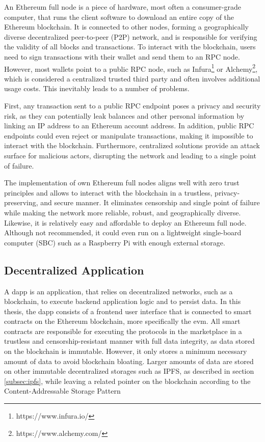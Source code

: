 An Ethereum full node is a piece of hardware, most often a consumer-grade computer, that runs the client software to download an entire copy of the Ethereum blockchain. It is connected to other nodes, forming a geographically diverse decentralized peer-to-peer (P2P) network, and is responsible for verifying the validity of all blocks and transactions. To interact with the blockchain, users need to sign transactions with their wallet and send them to an RPC node. However, most wallets point to a public RPC node, such as Infura\footnote{https://www.infura.io/} or Alchemy\footnote{https://www.alchemy.com/}, which is considered a centralized trusted third party and often involves additional usage costs. This inevitably leads to a number of problems.

First, any transaction sent to a public RPC endpoint poses a privacy and security risk, as they can potentially leak balances and other personal information by linking an IP address to an Ethereum account address. In addition, public RPC endpoints could even reject or manipulate transactions, making it impossible to interact with the blockchain. Furthermore, centralized solutions provide an attack surface for malicious actors, disrupting the network and leading to a single point of failure.

The implementation of own Ethereum full nodes aligns well with zero trust principles and allows to interact with the blockchain in a trustless, privacy-preserving, and secure manner. It eliminates censorship and single point of failure while making the network more reliable, robust, and geographically diverse. Likewise, it is relatively easy and affordable to deploy an Ethereum full node. Although not recommended, it could even run on a lightweight single-board computer (SBC) such as a Raspberry Pi with enough external storage.

\subsection{Decentralized Application}

A \acrfull{dapp} is an application, that relies on decentralized networks, such as a blockchain, to execute backend application logic and to persist data. In this thesis, the \acrshort{dapp} consists of a frontend user interface that is connected to smart contracts on the Ethereum blockchain, more specifically the \acrshort{evm}. All smart contracts are responsible for executing the protocols in the marketplace in a trustless and censorship-resistant manner with full data integrity, as data stored on the blockchain is immutable. However, it only stores a minimum necessary amount of data to avoid blockchain bloating. Larger amounts of data are stored on other immutable decentralized storages such as IPFS, as described in section \ref{subsec:ipfs}, while leaving a related pointer on the blockchain according to the Content-Addressable Storage Pattern \cite{eberhardtBlockchainInsightsOffChaining2017}

